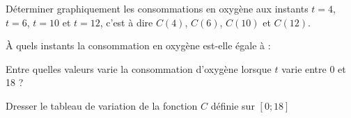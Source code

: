 \begin{questions}
	\question[2] Déterminer graphiquement les consommations en oxygène aux instants $t=4$, $t=6$, $t=10$ et $t=12$, c'est à dire $C(4)$, $C(6)$, $C(10)$ et $C(12)$.
	
	\question[2] \`A quels instants la consommation en oxygène est-elle égale à :

	\question[1] Entre quelles valeurs varie la consommation d'oxygène lorsque $t$ varie entre 0 et 18 ?
	
	\question [2] Dresser le tableau de variation de la fonction $C$ définie sur $\left[   0;18\right] $
\end{questions}